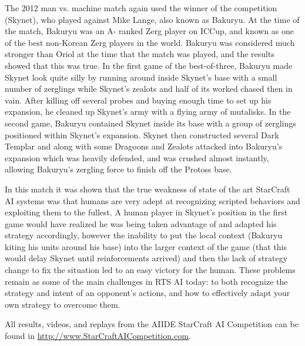 \documentclass[journal]{IEEEtran}
\begin{document}
The 2012 man vs. machine match again used the winner of the competition (Skynet), who played against
Mike Lange, also known as Bakuryu. At the time of the match, Bakuryu was an A- ranked Zerg player on ICCup,
and known as one of the best non-Korean Zerg players in the world. Bakuryu was considered much
stronger than Oriol at the time that the match was played, and the results showed that this was true.
In the first game of the best-of-three, Bakuryu made Skynet look quite silly by running around inside
Skynet's base with a small number of zerglings while Skynet's zealots and half of its worked chased
then in vain. After killing off several probes and buying enough time to set up his expansion, he
cleaned up Skynet's army with a flying army of mutalisks. In the second game, Bakuryu contained Skynet
inside its base with a group of zerglings positioned within Skynet's expansion. Skynet then constructed
several Dark Templar and along with some Dragoons and Zealots attacked into Bakuryu's expansion which
was heavily defended, and was crushed almost instantly, allowing Bakuryu's zergling force to finish
off the Protoss base. 

In this match it was shown that the true weakness of state of the art StarCraft AI systems was that
humans are very adept at recognizing scripted behaviors and exploiting them to the fullest. A human
player in Skynet's position in the first game would have realized he was being taken advantage of and
adapted his strategy accordingly, however the inability to put the local context (Bakuryu kiting his
units around his base) into the larger context of the game (that this would delay Skynet until
reinforcements arrived) and then the lack of strategy change to fix the situation led to an easy
victory for the human. These problems remain as some of the main challenges in RTS AI today: to both recognize
the strategy and intent of an opponent's actions, and how to effectively adapt your own strategy to 
overcome them.

All results, videos, and replays from the AIIDE StarCraft AI Competition can be found in \url{http://www.StarCraftAICompetition.com}.
\end{document}
